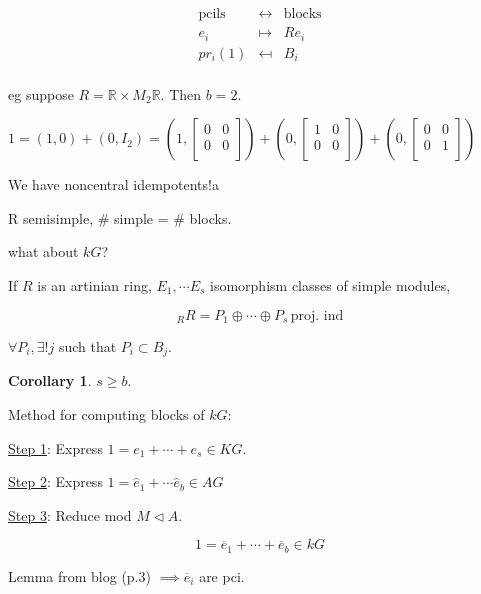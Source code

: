 \documentclass{article}
\theoremstyle{definition}
\newtheorem{corollary}[theorem]{Corollary}
\begin{document}
\[
    \begin{matrix}
        \text{pcils} & \leftrightarrow & \text{blocks} \\
        e_i & \mapsto & Re_i \\
        pr_i(1) & \mapsfrom & B_i \\
    \end{matrix} 
\]

eg suppose \(R = \mathbb{R} \times M_2\mathbb{R}\). Then \(b=2\).

\(1 = (1,0) + (0,I_2) = \left( 1, \begin{bmatrix}
    0 & 0\\
    0 & 0\\
\end{bmatrix}  \right) + \left( 0, \begin{bmatrix}
    1 & 0\\
    0 & 0\\
\end{bmatrix} \right) + \left( 0, \begin{bmatrix}
    0 & 0\\
    0 & 1\\
\end{bmatrix}  \right) \) 

We have noncentral idempotents!a

R semisimple, \# simple = \# blocks.

what about \(kG\)?

If \(R\) is an artinian ring, \(E_1, \cdots E_s\) isomorphism classes of simple modules,

\[
    _R R = P_1 \oplus \cdots \oplus P_s \, \text{proj. ind} 
\]

\(\forall P_i, \exists !j\) such that \(P_i \subset B_j\).

\begin{corollary}
    \(s \geq b\).
\end{corollary}

Method for computing blocks of \(kG\):

\underline{Step 1}: Express \(1 = e_1 + \cdots + e_s \in KG\).

\underline{Step 2}: Express \(1 = \widehat{e}_1 + \cdots \widehat{e}_b \in AG\)

\underline{Step 3}: Reduce mod \(M \triangleleft A\).

\[
    1 = \overline{e}_1 + \cdots + \overline{e}_b \in kG
\]

Lemma from blog (p.3) \(\implies \overline{e}_i\) are pci.
\end{document}
